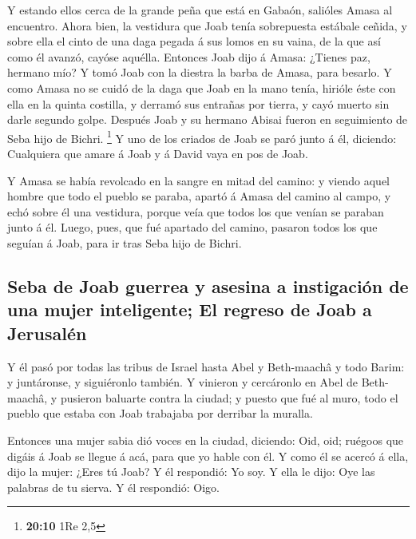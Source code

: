  Y estando ellos cerca de la grande peña que está en
Gabaón, salióles Amasa al encuentro. Ahora bien, la vestidura que Joab
tenía sobrepuesta estábale ceñida, y sobre ella el cinto de una daga
pegada á sus lomos en su vaina, de la que así como él avanzó, cayóse
aquélla.  Entonces Joab dijo á Amasa: ¿Tienes paz, hermano
mío? Y tomó Joab con la diestra la barba de Amasa, para besarlo.
 Y como Amasa no se cuidó de la daga que Joab en la mano
tenía, hirióle éste con ella en la quinta costilla, y derramó sus
entrañas por tierra, y cayó muerto sin darle segundo golpe. Después Joab
y su hermano Abisai fueron en seguimiento de Seba hijo de Bichri.
\footnote{\textbf{20:10} 1Re 2,5}  Y uno de los criados
de Joab se paró junto á él, diciendo: Cualquiera que amare á Joab y á
David vaya en pos de Joab.

 Y Amasa se había revolcado en la sangre en mitad del
camino: y viendo aquel hombre que todo el pueblo se paraba, apartó á
Amasa del camino al campo, y echó sobre él una vestidura, porque veía
que todos los que venían se paraban junto á él.  Luego,
pues, que fué apartado del camino, pasaron todos los que seguían á Joab,
para ir tras Seba hijo de Bichri.

\hypertarget{seba-de-joab-guerrea-y-asesina-a-instigaciuxf3n-de-una-mujer-inteligente-el-regreso-de-joab-a-jerusaluxe9n}{%
\subsection{Seba de Joab guerrea y asesina a instigación de una mujer
inteligente; El regreso de Joab a
Jerusalén}\label{seba-de-joab-guerrea-y-asesina-a-instigaciuxf3n-de-una-mujer-inteligente-el-regreso-de-joab-a-jerusaluxe9n}}

 Y él pasó por todas las tribus de Israel hasta Abel y
Beth-maachâ y todo Barim: y juntáronse, y siguiéronlo también.
 Y vinieron y cercáronlo en Abel de Beth-maachâ, y
pusieron baluarte contra la ciudad; y puesto que fué al muro, todo el
pueblo que estaba con Joab trabajaba por derribar la muralla.

 Entonces una mujer sabia dió voces en la ciudad,
diciendo: Oid, oid; ruégoos que digáis á Joab se llegue á acá, para que
yo hable con él.  Y como él se acercó á ella, dijo la
mujer: ¿Eres tú Joab? Y él respondió: Yo soy. Y ella le dijo: Oye las
palabras de tu sierva. Y él respondió: Oigo.

